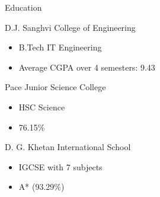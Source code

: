 \documentclass{article}
\newlength{\tabin}
\newlength{\secsep}
\newcommand{\lineunder}{\vspace*{-8pt} \\ \hspace*{-6pt} \hrulefill \\ \vspace*{-15pt}}
\newenvironment{tabbedsection}[1]{
  \begin{list}{}{
      \setlength{\itemsep}{0pt}
      \setlength{\labelsep}{0pt}
      \setlength{\labelwidth}{0pt}
      \setlength{\leftmargin}{\tabin}
      \setlength{\rightmargin}{\tabin}
      \setlength{\listparindent}{0pt}
      \setlength{\parsep}{0pt}
      \setlength{\parskip}{0pt}
      \setlength{\partopsep}{0pt}
      \setlength{\topsep}{#1}
    }
  \item[]
}{\end{list}}
\newenvironment{resume_section}[1]{
  \filbreak
  \vspace{2\secsep}
  \textsc{\large#1}
  \lineunder
  \begin{tabbedsection}{\secsep}
}{\end{tabbedsection}}
\newenvironment{resume_subsection}[2][]{
  \textbf{#2} \hfill {\footnotesize #1} \hspace{2em}
  \begin{tabbedsection}{0.5\secsep}
}{\end{tabbedsection}}
\newenvironment{subitems}{
  \renewcommand{\labelitemi}{-}
  \begin{itemize}
      \setlength{\labelsep}{1em}
}{\end{itemize}}
\begin{document}
\begin{resume_section}{Education}

    \begin{resume_subsection}[2019 - 2023 (expected)]{D.J. Sanghvi College of Engineering}
        \begin{subitems}
            \item B.Tech IT Engineering
            \item Average CGPA over 4 semesters: 9.43
        \end{subitems}
    \end{resume_subsection}


    \begin{resume_subsection}[2017 - 2019]{Pace Junior Science College}
        \begin{subitems}
            \item HSC Science
	    \item 76.15{\%}
        \end{subitems}
    \end{resume_subsection}

    \begin{resume_subsection}[2017]{D. G. Khetan International School}
        \begin{subitems}
            \item IGCSE with 7 subjects
	    \item A* (93.29{\%})
        \end{subitems}
    \end{resume_subsection}

\end{resume_section}

\vspace{1cm}
\end{document}
